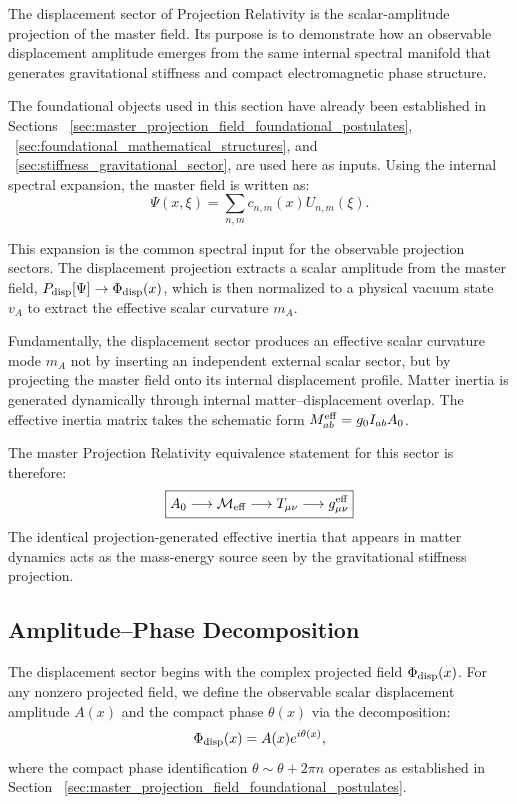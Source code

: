 \documentclass[11pt]{article}
\begin{document}
The displacement sector of Projection Relativity is the scalar-amplitude projection of the master field. Its purpose is to demonstrate how an observable displacement amplitude emerges from the same internal spectral manifold that generates gravitational stiffness and compact electromagnetic phase structure.

The foundational objects used in this section have already been established in Sections ~\ref{sec:master_projection_field_foundational_postulates}, ~\ref{sec:foundational_mathematical_structures}, and ~\ref{sec:stiffness_gravitational_sector}, are used here as inputs. Using the internal spectral expansion, the master field is written as:
\begin{equation}
\Psi(x, \xi) = \sum_{n,m} c_{n,m}(x) U_{n,m}(\xi).
\end{equation}

This expansion is the common spectral input for the observable projection sectors. The displacement projection extracts a scalar amplitude from the master field, $P_{\rm disp}[\Psi] \rightarrow \Phi_{\rm disp}(x)$, which is then normalized to a physical vacuum state $v_A$ to extract the effective scalar curvature $m_A$. 

Fundamentally, the displacement sector produces an effective scalar curvature mode $m_A$ not by inserting an independent external scalar sector, but by projecting the master field onto its internal displacement profile. Matter inertia is generated dynamically through internal matter–displacement overlap. The effective inertia matrix takes the schematic form $M_{ab}^{\rm eff} = g_0 I_{ab} A_0$. 

The master Projection Relativity equivalence statement for this sector is therefore:
\begin{equation}
\boxed{ A_0 \longrightarrow \mathcal M_{\rm eff} \longrightarrow T_{\mu\nu} \longrightarrow g_{\mu\nu}^{\rm eff} }
\end{equation}
The identical projection-generated effective inertia that appears in matter dynamics acts as the mass-energy source seen by the gravitational stiffness projection.

\subsection{Amplitude–Phase Decomposition}
\label{sec:amplitude_phase_decomposition}

The displacement sector begins with the complex projected field $\Phi_{\rm disp}(x)$. For any nonzero projected field, we define the observable scalar displacement amplitude $A(x)$ and the compact phase $\theta(x)$ via the decomposition:
\begin{equation}
\Phi_{\rm disp}(x) = A(x)e^{i\theta(x)},
\end{equation}
where the compact phase identification $\theta \sim \theta + 2\pi n$ operates as established in Section ~\ref{sec:master_projection_field_foundational_postulates}.
\end{document}
